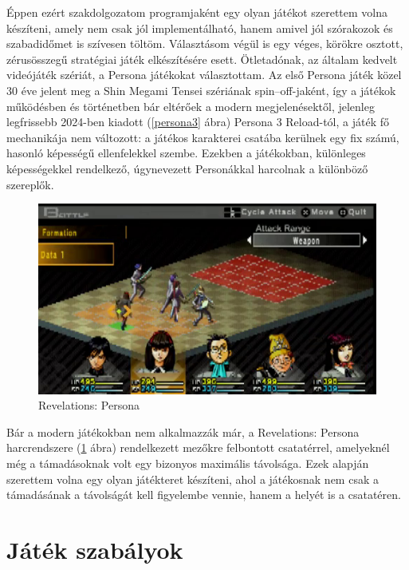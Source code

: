 \documentclass[
]{thesis-ekf}
\theoremstyle{definition}
\theoremstyle{remark}
\begin{document}
Éppen ezért szakdolgozatom programjaként egy olyan játékot szerettem volna készíteni, amely nem csak jól implementálható, hanem amivel jól szórakozok és szabadidőmet is szívesen töltöm. Választásom végül is egy véges, körökre osztott, zérusösszegű stratégiai játék elkészítésére esett. Ötletadónak, az általam kedvelt videójáték szériát, a Persona játékokat választottam. Az első Persona játék közel 30 éve jelent meg a Shin Megami Tensei szériának spin--off-jaként, így a játékok működésben és történetben bár eltérőek a modern megjelenésektől, jelenleg legfrissebb 2024-ben kiadott (\ref{persona3} ábra) Persona 3 Reload-tól, a játék fő mechanikája nem változott: a játékos karakterei csatába kerülnek egy fix számú, hasonló képességű ellenfelekkel szembe. Ezekben a játékokban, különleges képességekkel rendelkező, úgynevezett Personákkal harcolnak a különböző szereplők. \cite{Persona,Persona3}

\begin{figure}[h!]
	\centering
	\includegraphics[width=13cm]{./pictures/persona_psp.png}
	\caption{Revelations: Persona}
	\label{persona1}
\end{figure}

Bár a modern játékokban nem alkalmazzák már, a Revelations: Persona harcrendszere (\ref{persona1} ábra) rendelkezett mezőkre felbontott csatatérrel, amelyeknél még a támadásoknak volt egy bizonyos maximális távolsága. Ezek alapján szerettem volna egy olyan játékteret készíteni, ahol a játékosnak nem csak a támadásának a távolságát kell figyelembe vennie, hanem a helyét is a csatatéren. \cite{Persona1,Persona1Gameplay}

\section{Játék szabályok} \label{rules}
\end{document}
